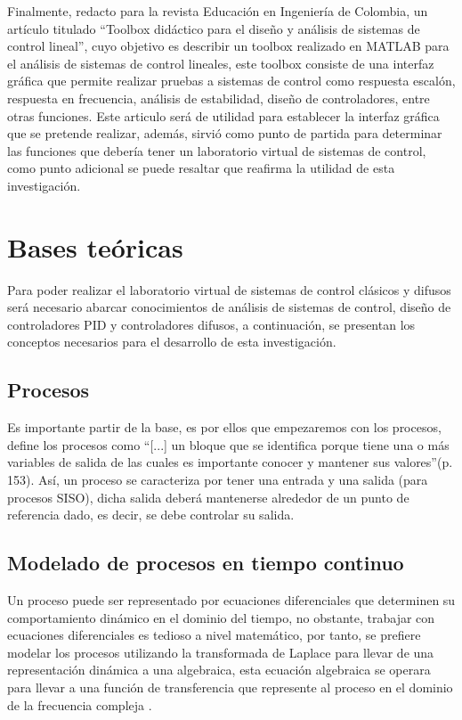 	Finalmente, \textcite{cadavid2009toolbox} redacto para la revista Educación en Ingeniería de Colombia, un artículo titulado \enquote{Toolbox didáctico para el diseño y análisis de sistemas de control lineal}, cuyo objetivo es describir un toolbox realizado en MATLAB para el análisis de sistemas de control lineales, este toolbox consiste de una interfaz gráfica que permite realizar pruebas a sistemas de control como respuesta escalón, respuesta en frecuencia, análisis de estabilidad, diseño de controladores, entre otras funciones. Este articulo será de utilidad para establecer la interfaz gráfica que se pretende realizar, además, sirvió como punto de partida para determinar las funciones que debería tener un laboratorio virtual de sistemas de control, como punto adicional se puede resaltar que reafirma la utilidad de esta investigación. 
	
\section{Bases teóricas}
	
	Para poder realizar el laboratorio virtual de sistemas de control clásicos y difusos será necesario abarcar conocimientos de análisis de sistemas de control, diseño de controladores PID y controladores difusos, a continuación, se presentan los conceptos necesarios para el desarrollo de esta investigación.
	
	\subsection{Procesos}
		
		Es importante partir de la base, es por ellos que empezaremos con los procesos, \textcite{sanchez2003control} define los procesos como \enquote{[...] un bloque que se identifica porque tiene una o más variables de salida de las cuales es importante conocer y mantener sus valores}(p.$\,$153). Así, un proceso se caracteriza por tener una entrada y una salida (para procesos SISO), dicha salida deberá mantenerse alrededor de un punto de referencia dado, es decir, se debe controlar su salida.
	
	\subsection{Modelado de procesos en tiempo continuo}
	
		Un proceso puede ser representado por ecuaciones diferenciales que determinen su comportamiento dinámico en el dominio del tiempo, no obstante, trabajar con ecuaciones diferenciales es tedioso a nivel matemático, por tanto, se prefiere modelar los procesos utilizando la transformada de Laplace para llevar de una representación dinámica a una algebraica, esta ecuación algebraica se operara para llevar a una función de transferencia que represente al proceso en el dominio de la frecuencia compleja \Parencite{smith1985principles}.
	
